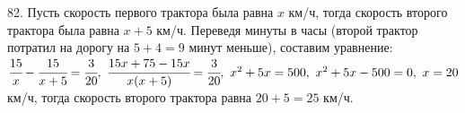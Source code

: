82. Пусть скорость первого трактора была равна $x$ км/ч, тогда скорость второго трактора была равна $x+5$ км/ч. Переведя минуты в часы (второй трактор потратил на дорогу на $5+4=9$ минут меньше), составим уравнение: $\cfrac{15}{x}-\cfrac{15}{x+5}=\cfrac{3}{20},\
\cfrac{15x+75-15x}{x(x+5)}=\cfrac{3}{20},\ x^2+5x=500,\ x^2+5x-500=0,\ x=20$км/ч, тогда скорость второго трактора равна $20+5=25$ км/ч.\\
